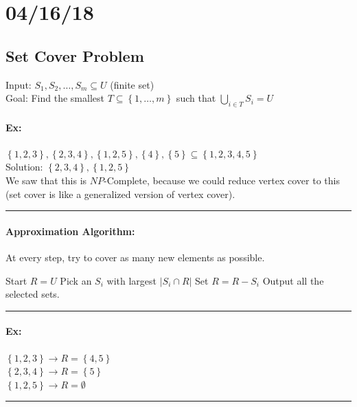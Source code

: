 \documentclass[12 pt]{article}
\begin{document}
          \section{04/16/18}
          \subsection{Set Cover Problem}
          Input: $S_1, S_2, \ldots, S_m \subseteq U$ (finite set)
          \\ Goal: Find the smallest $T\subseteq
          \left\{1,\ldots,m\right\}$ such that $\bigcup_{i\in T}S_i =
          U$
          \paragraph{Ex:} $\left\{1,2,3\right\}, \left\{2,3,4\right\},
          \left\{1,2,5\right\}, \left\{4\right\}, \left\{5\right\}
          \subseteq \left\{1,2,3,4,5\right\}$
          \\ Solution: $\left\{2,3,4\right\}, \left\{1,2,5\right\}$
          \\ We saw that this is $NP$-Complete, because we could
          reduce vertex cover to this (set cover is like a generalized
          version of vertex cover).
          \\ \noindent \rule{\textwidth}{0.5pt}
          \paragraph{Approximation Algorithm:} At every step, try to
          cover as many new elements as possible. 
          \begin{algorithmic}
            \State Start $R=U$
                \State Pick an $S_i$ with largest $\left|S_i \cap
                  R\right|$
                \State Set $R = R - S_i$
            \EndWhile
            \State Output all the selected sets.
          \end{algorithmic}
          \noindent \rule{\textwidth}{0.5pt}
          \paragraph{Ex:} $\left\{1,2,3\right\} \to R =
          \left\{4,5\right\}$
          \\ $\left\{2,3,4\right\}\to R=\left\{5\right\}$
          \\ $\left\{1,2,5\right\}\to R = \emptyset$
          \\ \noindent \rule{\textwidth}{0.5pt}
\end{document}
